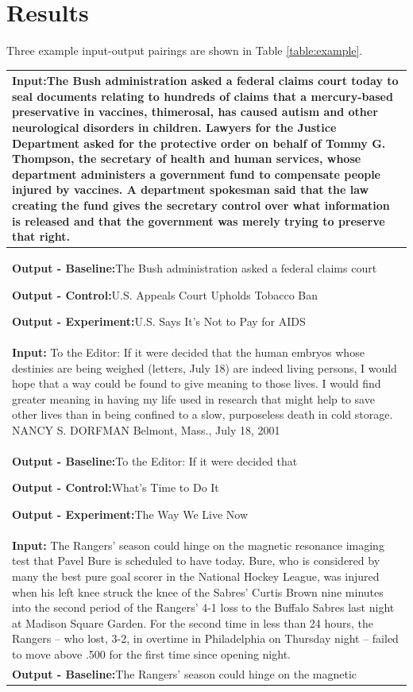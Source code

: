 \documentclass[11pt]{article}
\begin{document}
\section{Results}

Three example input-output pairings are shown in Table \ref{table:example}.

\begin{table}[h!]
\centering
\begin{tiny}
\begin{tabular}{|p{7cm}|} 

 \hline
 \textbf{Input:}The Bush administration asked a federal claims court today to seal documents relating to hundreds of claims that a mercury-based preservative in vaccines, thimerosal, has caused autism and other neurological disorders in children. Lawyers for the Justice Department asked for the protective order on behalf of Tommy G. Thompson, the secretary of health and human services, whose department administers a government fund to compensate people injured by vaccines. A department spokesman said that the law creating the fund gives the secretary control over what information is released and that the government was merely trying to preserve that right.
 \\ [0.5ex] 
 \hline
 \textbf{Output - Baseline:}The Bush administration asked a federal claims court
 
 \textbf{Output - Control:}U.S. Appeals Court Upholds Tobacco Ban

 \textbf{Output - Experiment:}U.S. Says It's Not to Pay for AIDS \\ 
 \hline
 \hline
 \textbf{Input:} To the Editor: If it were decided that the human embryos whose destinies are being weighed (letters, July 18) are indeed living persons, I would hope that a way could be found to give meaning to those lives. I would find greater meaning in having my life used in research that might help to save other lives than in being confined to a slow, purposeless death in cold storage. NANCY S. DORFMAN  Belmont, Mass., July 18, 2001 \\ [0.5ex] 
 \hline
 \textbf{Output - Baseline:}To the Editor: If it were decided that
 
 \textbf{Output - Control:}What's Time to Do It

 \textbf{Output - Experiment:}The Way We Live Now \\ 
 \hline
 \hline
 \textbf{Input:} The Rangers' season could hinge on the magnetic resonance imaging test that Pavel Bure is scheduled to have today. Bure, who is considered by many the best pure goal scorer in the National Hockey League, was injured when his left knee struck the knee of the Sabres' Curtis Brown nine minutes into the second period of the Rangers' 4-1 loss to the Buffalo Sabres last night at Madison Square Garden. For the second time in less than 24 hours, the Rangers -- who lost, 3-2, in overtime in Philadelphia on Thursday night -- failed to move above .500 for the first time since opening night. \\ [0.5ex] 
 \hline
 \textbf{Output - Baseline:}The Rangers' season could hinge on the magnetic
 

\end{tabular}
\end{tiny}
\end{table}
\end{document}
